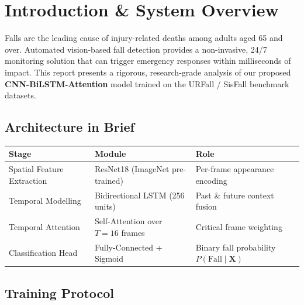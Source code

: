 \documentclass[12pt,a4paper]{article}
\begin{document}
\tableofcontents
\clearpage

\section{Introduction \& System Overview}

Falls are the leading cause of injury-related deaths among adults aged 65 and over. Automated vision-based fall detection provides a non-invasive, 24/7 monitoring solution that can trigger emergency responses within milliseconds of impact. This report presents a rigorous, research-grade analysis of our proposed \textbf{CNN-BiLSTM-Attention} model trained on the URFall / SisFall benchmark datasets.

\subsection{Architecture in Brief}

\begin{center}
\small
\begin{tabular}{lll}
\toprule
\textbf{Stage} & \textbf{Module} & \textbf{Role}\\
\midrule
Spatial Feature Extraction & ResNet18 (ImageNet pre-trained) & Per-frame appearance encoding\\
Temporal Modelling & Bidirectional LSTM (256 units) & Past \& future context fusion\\
Temporal Attention & Self-Attention over $T{=}16$ frames & Critical frame weighting\\
Classification Head & Fully-Connected + Sigmoid & Binary fall probability $P(\text{Fall}\mid\mathbf{X})$\\
\bottomrule
\end{tabular}
\end{center}

\subsection{Training Protocol}
\end{document}
